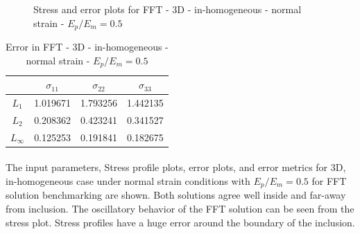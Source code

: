 \documentclass[12pt, a4paper]{report}
\begin{document}
\begin{figure}[htbp]
  \centering
  \hfill
  \caption{Stress and error plots for FFT - 3D - in-homogeneous - normal strain - $E_p/E_m = 0.5$}
\end{figure}

\begin{table}[H]
    \centering
    \begin{tabular}{|c|c|c|c|}
        \hline
        &\textbf{$\sigma_{11}$} &  \textbf{$\sigma_{22}$} & \textbf{$\sigma_{33}$}\\
        \hline
        $L_1$ & 1.019671 & 1.793256 & 1.442135 \\
        \hline
        $L_2$ & 0.208362 & 0.423241 & 0.341527 \\
        \hline 
        $L_\infty$ & 0.125253 & 0.191841 & 0.182675 \\
        \hline
    \end{tabular}
    \caption{Error in FFT - 3D - in-homogeneous - normal strain - $E_p/E_m = 0.5$}
\end{table}

\paragraph{}
The input parameters, Stress profile plots, error plots, and error metrics for 3D, in-homogeneous case under normal strain conditions with $E_p / E_m = 0.5$ for FFT solution benchmarking are shown. Both solutions agree well inside and far-away from inclusion. The oscillatory behavior of the FFT solution can be seen from the stress plot. Stress profiles have a huge error around the boundary of the inclusion.
\end{document}
